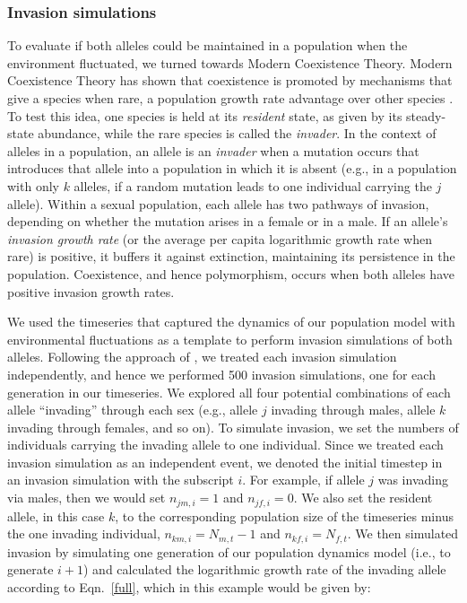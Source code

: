 \documentclass[12pt]{article}
\begin{document}
\subsubsection*{Invasion simulations}

 To evaluate if both alleles could be maintained in a population when the environment fluctuated, we turned towards Modern Coexistence Theory. Modern Coexistence Theory has shown that coexistence is promoted by mechanisms that give a species when rare, a population growth rate advantage over other species \citep{chesson_stabilizing_1982, chesson2003quantifying, barabas_chessons_2018}. To test this idea, one species is held at its \textit{resident} state, as given by its steady-state abundance, while the rare species is called the \textit{invader}. In the context of alleles in a population, an allele is an \textit{invader} when a mutation occurs that introduces that allele into a population in which it is absent (e.g., in a population with only $k$ alleles, if a random mutation leads to one individual carrying the $j$ allele). Within a sexual population, each allele has two pathways of invasion, depending on whether the mutation arises in a female or in a male. If an allele's \textit{invasion growth rate} (or the average per capita logarithmic growth rate when rare) is positive, it buffers it against extinction, maintaining its persistence in the population.  Coexistence, and hence polymorphism, occurs when both alleles have positive invasion growth rates.

We used the timeseries that captured the dynamics of our population model with environmental fluctuations as a template to perform invasion simulations of both alleles. Following the approach of \citet{ellner2016quantify}, we treated each invasion simulation independently, and hence we performed 500 invasion simulations, one for each generation in our timeseries. We explored all four potential combinations of each allele ``invading'' through each sex (e.g., allele $j$ invading through males, allele $k$ invading through females, and so on). To simulate invasion, we set the numbers of individuals carrying the invading allele to one individual. Since we treated each invasion simulation as an independent event, we denoted the initial timestep in an invasion simulation with the subscript $i$. For example, if allele $j$ was invading via males, then we would set $n_{jm,i} = 1$ and $n_{jf,i}= 0$. We also set the resident allele, in this case $k$, to the corresponding population size of the timeseries minus the one invading individual, $n_{km,i} = N_{m,t} -1$ and $n_{kf,i} = N_{f,t}$. We then simulated invasion by simulating one generation of our population dynamics model (i.e., to generate $i+1$) and calculated the logarithmic growth rate of the invading allele according to Eqn.~\ref{full}, which in this example would be given by:
\end{document}
